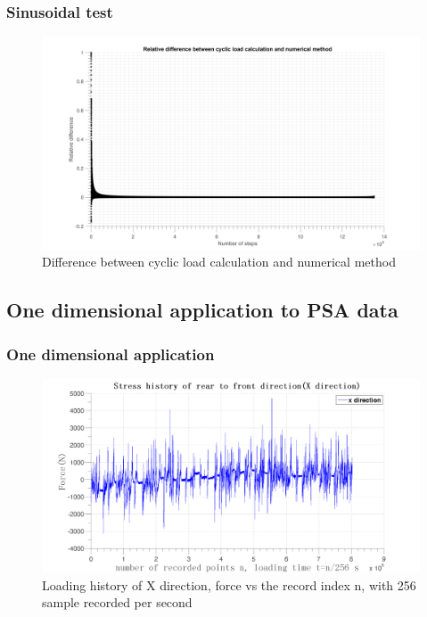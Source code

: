 \documentclass[xcolor=table]{Bredelebeamer}
\begin{document}
\begin{frame}
	\frametitle{Sinusoidal test}
	\begin{figure}[!h]
		\centering
		\includegraphics[width=\textwidth]{figures//Damagediff.png} 
		\caption{Difference between cyclic load calculation and numerical method}
		\label{Damagediff}
	\end{figure}
\end{frame}	
\subsection{One dimensional application to PSA data}

\begin{frame}
	\frametitle{One dimensional application}
\begin{figure}[!h]
	\centering
	\includegraphics[width=\textwidth]{figures//x.png} 
	\caption{Loading history of X direction, force vs the record index n, with 256 sample recorded per second}
	\label{x}
\end{figure}
\end{frame}	
\end{document}
